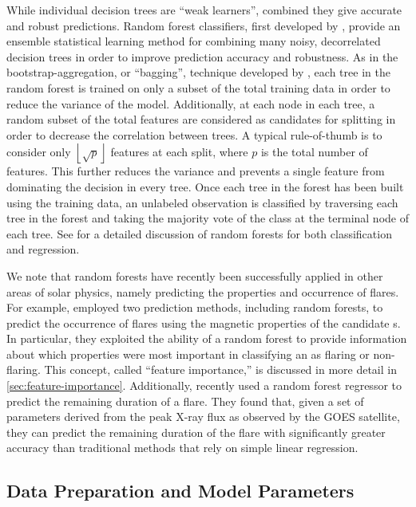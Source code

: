 While individual decision trees are ``weak learners'', combined they give accurate and robust predictions.
Random forest classifiers, first developed by \citet{breiman_random_2001}, provide an ensemble statistical learning method for combining many noisy, decorrelated decision trees in order to improve prediction accuracy and robustness.
As in the bootstrap-aggregation, or ``bagging'', technique developed by \citet{breiman_bagging_1996}, each tree in the random forest is trained on only a subset of the total training data in order to reduce the variance of the model.
Additionally, at each node in each tree, a random subset of the total features are considered as candidates for splitting in order to decrease the correlation between trees.
A typical rule-of-thumb is to consider only $\left\lfloor\sqrt{p}\right\rfloor$ features at each split, where $p$ is the total number of features.
This further reduces the variance and prevents a single feature from dominating the decision in every tree.
Once each tree in the forest has been built using the training data, an unlabeled observation is classified by traversing each tree in the forest and taking the majority vote of the class at the terminal node of each tree.
See \citet[chapter 15]{hastie_elements_2009} for a detailed discussion of random forests for both classification and regression.

We note that random forests have recently been successfully applied in other areas of solar physics, namely predicting the properties and occurrence of flares.
For example, \citet{campi_feature_2019} employed two prediction methods, including random forests, to predict the occurrence of flares using the magnetic properties of the candidate \AR s.
In particular, they exploited the ability of a random forest to provide information about which properties were most important in classifying an \AR{} as flaring or non-flaring.
This concept, called ``feature importance,'' is discussed in more detail in \autoref{sec:feature-importance}.
Additionally, \citet{reep_forecasting_2021} recently used a random forest regressor to predict the remaining duration of a flare.
They found that, given a set of parameters derived from the peak X-ray flux as observed by the GOES satellite, they can predict the remaining duration of the flare with significantly greater accuracy than traditional methods that rely on simple linear regression.

\subsection{Data Preparation and Model Parameters}\label{sec:data-prep}


